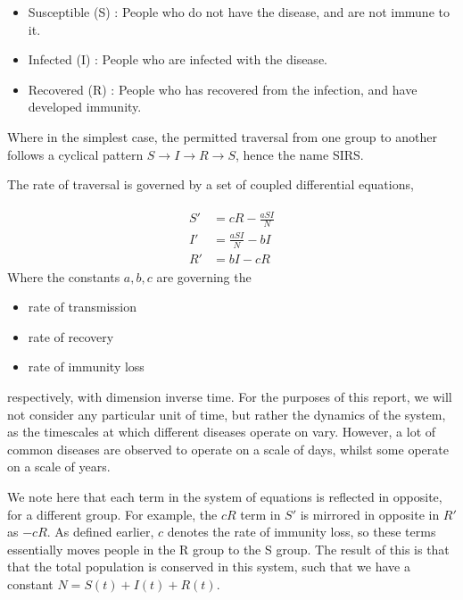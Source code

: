 \documentclass[10pt,showpacs,preprintnumbers,amsmath,amssymb,nofootinbib,aps,prl,twocolumn,groupedaddress,superscriptaddress,showkeys]{revtex4-1}
\begin{document}
    \begin{itemize}
      \item Susceptible (S) : People who do not have the disease, and are not immune to it.
      \item Infected (I) : People who are infected with the disease.
      \item Recovered (R) : People who has recovered from the infection, and have developed immunity.
    \end{itemize}

    Where in the simplest case, the permitted traversal from one group to another follows a cyclical pattern $S \rightarrow I \rightarrow R \rightarrow S$, hence the name SIRS.

    The rate of traversal is governed by a set of coupled differential equations,

    \begin{align}
      \begin{split}
        S' &= cR - \frac{aSI}{N} \\
        I' &= \frac{aSI}{N} - bI \\
        R' &= bI - cR 
        \label{eqn:transition rates, basic}
      \end{split}
    \end{align}
    Where the constants $a,b,c$ are governing the

    \begin{itemize}
      \item rate of transmission
      \item rate of recovery
      \item rate of immunity loss
    \end{itemize}

    respectively, with dimension inverse time. For the purposes of this report, we will not consider any particular unit of time, but rather the dynamics of the system, as the timescales at which different diseases operate on vary. However, a lot of common diseases are observed to operate on a scale of days, whilst some operate on a scale of years.

    We note here that each term in the system of equations is reflected in opposite, for a different group. For example, the $cR$ term in $S'$ is mirrored in opposite in $R'$ as $-cR$. As defined earlier, $c$ denotes the rate of immunity loss, so these terms essentially moves people in the R group to the S group.
    The result of this is that that the total population is conserved in this system, such that we have a constant $N = S(t) + I(t) + R(t)$.
\end{document}
